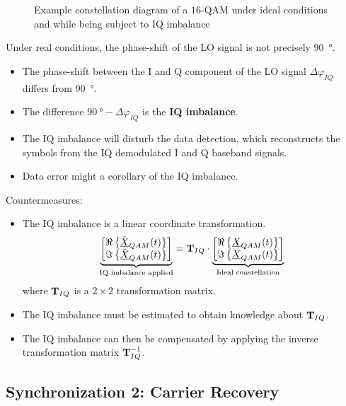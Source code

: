 \begin{refsection}
\begin{figure}[H]
	\caption{Example constellation diagram of a $16$-\acs{QAM} under ideal conditions and while being subject to IQ imbalance}
\end{figure}

Under real conditions, the phase-shift of the \ac{LO} signal is not precisely \SI{90}{\degree}.
\begin{itemize}
	\item The phase-shift between the \ac{I} and \ac{Q} component of the \ac{LO} signal $\Delta \varphi_{IQ}$ differs from \SI{90}{\degree}.
	\item The difference $\SI{90}{\degree} - \Delta \varphi_{IQ}$ is the  \textbf{IQ imbalance}.
	\item The IQ imbalance will disturb the data detection, which reconstructs the symbols from the IQ demodulated \ac{I} and \ac{Q} baseband signals.
	\item Data error might a corollary of the IQ imbalance.
\end{itemize}

Countermeasures:
\begin{itemize}
	\item The IQ imbalance is a linear coordinate transformation.
	\begin{equation}
		\underbrace{\left[\begin{matrix}\Re\left\{\tilde{\underline{X}}_{QAM}(t)\right\}\\ \Im\left\{\tilde{\underline{X}}_{QAM}(t)\right\}\end{matrix}\right]}_{\text{IQ imbalance applied}} = \bm{\mathrm{T}}_{IQ} \cdot \underbrace{\left[\begin{matrix}\Re\left\{\underline{X}_{QAM}(t)\right\}\\ \Im\left\{\underline{X}_{QAM}(t)\right\}\end{matrix}\right]}_{\text{Ideal constellation}}
	\end{equation}
	where $\bm{\mathrm{T}}_{IQ}$ is a $2 \times 2$ transformation matrix.
	\item The IQ imbalance must be estimated to obtain knowledge about $\bm{\mathrm{T}}_{IQ}$.
	\item The IQ imbalance can then be compensated by applying the inverse transformation matrix $\bm{\mathrm{T}}_{IQ}^{-1}$.
\end{itemize}

\subsection{Synchronization 2: Carrier Recovery}


\end{refsection}
